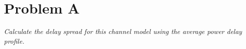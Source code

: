 \section{Problem A}
\textit{Calculate the delay spread for this channel model using the average power delay profile.}
